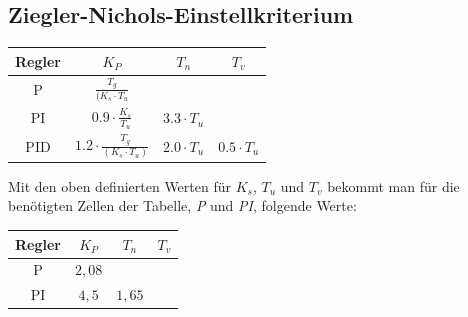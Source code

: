 \documentclass{article}
\begin{document}
		\subsection{Ziegler-Nichols-Einstellkriterium}
			\begin{center}
				\begin{tabular}{ c || c | c | c }
					 Regler & $K_P$ & $T_n$ & $T_v$ \\ 
					 \hline\hline
					 P & $\frac{T_g}{(K_s \cdot T_u}$ &  &  \\  
					 \hline
					 PI & $0.9 \cdot \frac{K_s}{T_u}$ & $3.3 \cdot T_u$ &    \\
					 \hline
					 PID & $1.2 \cdot \frac{T_g}{(K_s \cdot T_u)}$ & $2.0 \cdot T_u$ & $0.5 \cdot T_u$
				\end{tabular}
			\end{center}
\vspace{3mm}
			Mit den oben definierten Werten für $K_s$, $T_u$ und $T_v$ bekommt man für die benötigten Zellen der Tabelle, \textit{P} und \textit{PI}, folgende Werte:
			\begin{center}
				\begin{tabular}{ c || c | c | c }
					 Regler & $K_P$ & $T_n$ & $T_v$ \\ 
					 \hline\hline
					 P & $2,08$ &  &  \\  
					 \hline
					 PI & $4,5$ & $1,65$ & 
				\end{tabular}
			\end{center}
\newpage
\end{document}
